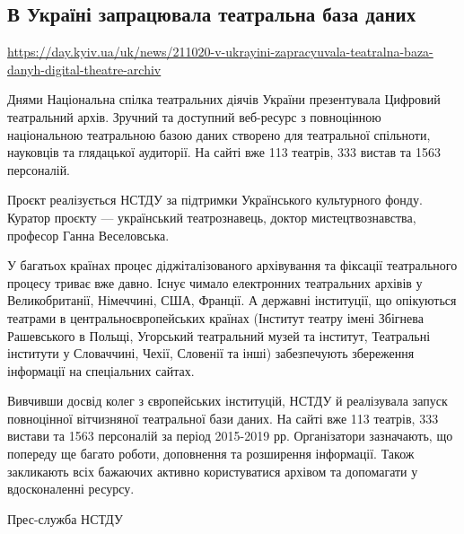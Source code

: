  
 

\subsection{В Україні запрацювала театральна база даних}
\label{sec:21_10_2020.news.ua.day_kiev_ua.1.theatre_database_start}
\url{https://day.kyiv.ua/uk/news/211020-v-ukrayini-zapracyuvala-teatralna-baza-danyh-digital-theatre-archiv}

Днями Національна спілка театральних діячів України презентувала Цифровий
театральний архів. Зручний та доступний веб-ресурс з повноцінною національною
театральною базою даних створено для театральної спільноти, науковців та
глядацької аудиторії. На сайті вже 113 театрів, 333 вистав та 1563 персоналій.

Проєкт реалізується НСТДУ за підтримки Українського культурного фонду. Куратор
проєкту --- український театрознавець, доктор мистецтвознавства, професор Ганна
Веселовська.

У багатьох країнах процес діджіталізованого архівування та фіксації
театрального процесу триває вже давно. Існує чимало електронних театральних
архівів у Великобританії, Німеччині, США, Франції. А державні інституції, що
опікуються театрами в центральноєвропейських країнах (Інститут театру імені
Збігнева Рашевського в Польщі, Угорський театральний музей та інститут,
Театральні інститути у Словаччині, Чехії, Словенії та інші) забезпечують
збереження інформації на спеціальних сайтах.

Вивчивши досвід колег з європейських інституцій, НСТДУ й реалізувала запуск
повноцінної вітчизняної театральної бази даних. На сайті вже 113 театрів, 333
вистави та 1563 персоналій за період 2015-2019 рр. Організатори зазначають, що
попереду ще багато роботи, доповнення та розширення інформації. Також
закликають всіх бажаючих активно користуватися архівом та допомагати у
вдосконаленні ресурсу.

Прес-служба НСТДУ
